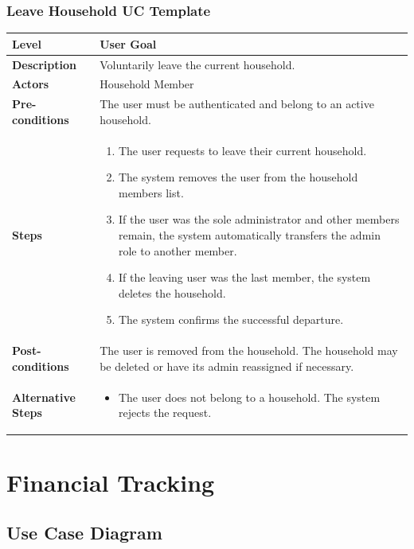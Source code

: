 \subsubsection{Leave Household UC Template}
\begin{longtable}{|p{3.5cm}|p{10.3cm}|}
\hline
\rowcolor{UCRow} \textbf{Level} & User Goal \\ \hline
\textbf{Description} & Voluntarily leave the current household. \\ \hline
\rowcolor{UCRow} \textbf{Actors} & Household Member \\ \hline
\textbf{Pre-conditions} & The user must be authenticated and belong to an active household. \\ \hline
\rowcolor{UCRow} \textbf{Steps} &
\begin{enumerate}[nosep, leftmargin=*]
    \item The user requests to leave their current household.
    \item The system removes the user from the household members list.
    \item If the user was the sole administrator and other members remain, the system automatically transfers the admin role to another member.
    \item If the leaving user was the last member, the system deletes the household.
    \item The system confirms the successful departure.
\end{enumerate} \\ \hline
\textbf{Post-conditions} & The user is removed from the household. The household may be deleted or have its admin reassigned if necessary. \\ \hline
\rowcolor{UCRow} \textbf{Alternative Steps} &
\begin{itemize}[nosep, leftmargin=2.5em]
    \item[\textbf{A1.}] The user does not belong to a household. The system rejects the request.
\end{itemize} \\ \hline
\end{longtable}

\section{Financial Tracking}

\subsection{Use Case Diagram}

